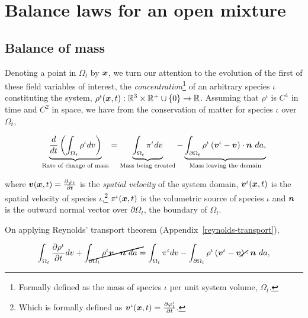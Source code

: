 \section{Balance laws for an open mixture}
\label{eu-balance-laws}
                                   
\subsection{Balance of mass}
\label{eu-balance-of-mass}

Denoting a point in $\Omega_{t}$ by $\mbox{\boldmath$ x$}$, we turn our attention to
the evolution of the first of these field variables of interest, the
{\em concentration}\footnote{Formally defined as the mass of species
  $\iota$ per unit system volume, $\Omega_{t}$.} of an arbitrary
species $\iota$ constituting the system, $\rho^{\iota}(\mbox{\boldmath$ x$},t):
\mathbb{R}^3\times\mathbb{R}^{+}\cup\{0\} \rightarrow
\mathbb{R}$. Assuming that $\rho^{\iota}$ is {\color{Blue}
  $\mathit{C}^{1}$} in time and {\color{Blue} $\mathit{C}^{2}$} in
space, we have from the conservation of matter for species $\iota$
over $\Omega_{t}$,


\begin{equation}
\underbrace{\frac{d}{dt}\left(\int_{\Omega_{t}} \rho^{\iota} dv
  \right)}_{\text{Rate of change of mass}} = 
 \underbrace{\int_{\Omega_{t}}
  \pi^{\iota} dv}_{\text{Mass being created}}
- \underbrace{\int_{\partial \Omega_{t}} \rho^{\iota}
  \left(\bv^{\iota} - \bv\right) \cdot \bn\ 
da,}_{\text{Mass leaving the domain}}
\label{globalbalanceofmass}
\end{equation}

 where $\mbox{\boldmath$ v$}(\mbox{\boldmath$ x$},t) = \frac{\partial \varphi_{t}}{\partial t}$
is the {\em spatial velocity} of the system domain,
$\mbox{\boldmath$ v$}^{\iota}(\mbox{\boldmath$ x$},t)$ is the spatial velocity of species
$\iota$,\footnote{Which is formally defined as $\mbox{\boldmath$ v$}^{\iota}(\mbox{\boldmath$ x$},t) =
  \frac{\partial \varphi^{\iota}_{t}}{\partial t}$.} %
 $\pi^{\iota}(\mbox{\boldmath$ x$},t)$ is the volumetric source of species $\iota$ and
$\mbox{\boldmath$ n$}$ is the outward normal vector over $\partial \Omega_{t}$, the
boundary of $\Omega_{t}$.

On applying Reynolds' transport theorem (Appendix~\ref{reynolds-transport}),

\begin{equation*}
\int_{\Omega_{t}} \frac{\partial \rho^{\iota}}{\partial t} dv
+ \cancel{\int_{\partial \Omega_{t}} \rho^{\iota} \bv \cdot \bn\ da} =
\int_{\Omega_{t}} \pi^{\iota} dv
- \int_{\partial \Omega_{t}} \rho^{\iota} \left(\bv^{\iota} -
\cancel{\bv}\right) \cdot \bn\ da,
\end{equation*}

